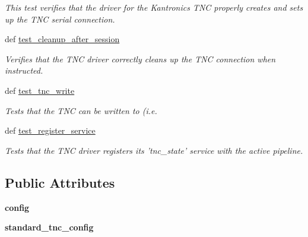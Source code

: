 \begin{DoxyCompactItemize}
\begin{DoxyCompactList}\small\item\em This test verifies that the driver for the Kantronics T\-N\-C properly creates and sets up the T\-N\-C serial connection. \end{DoxyCompactList}\item 
def \hyperlink{classhwm_1_1hardware_1_1devices_1_1drivers_1_1kantronics__tnc_1_1tests_1_1test__kantronics__tnc_1_1_test_kantronics_t_n_c_ac1971ff48d4838b899db511b9185f3a7}{test\-\_\-cleanup\-\_\-after\-\_\-session}
\begin{DoxyCompactList}\small\item\em Verifies that the T\-N\-C driver correctly cleans up the T\-N\-C connection when instructed. \end{DoxyCompactList}\item 
def \hyperlink{classhwm_1_1hardware_1_1devices_1_1drivers_1_1kantronics__tnc_1_1tests_1_1test__kantronics__tnc_1_1_test_kantronics_t_n_c_aff547efa7f6b0b6c7746dfc44da8e93e}{test\-\_\-tnc\-\_\-write}
\begin{DoxyCompactList}\small\item\em Tests that the T\-N\-C can be written to (i.\-e. \end{DoxyCompactList}\item 
def \hyperlink{classhwm_1_1hardware_1_1devices_1_1drivers_1_1kantronics__tnc_1_1tests_1_1test__kantronics__tnc_1_1_test_kantronics_t_n_c_a989a85b7954780f2c516f0b4fcaede33}{test\-\_\-register\-\_\-service}
\begin{DoxyCompactList}\small\item\em Tests that the T\-N\-C driver registers its 'tnc\-\_\-state' service with the active pipeline. \end{DoxyCompactList}\end{DoxyCompactItemize}
\subsection*{Public Attributes}
\begin{DoxyCompactItemize}
\item 
\hypertarget{classhwm_1_1hardware_1_1devices_1_1drivers_1_1kantronics__tnc_1_1tests_1_1test__kantronics__tnc_1_1_test_kantronics_t_n_c_a7ef03a21768078be4d2d52ab841e6cb2}{{\bfseries config}}\label{classhwm_1_1hardware_1_1devices_1_1drivers_1_1kantronics__tnc_1_1tests_1_1test__kantronics__tnc_1_1_test_kantronics_t_n_c_a7ef03a21768078be4d2d52ab841e6cb2}

\item 
\hypertarget{classhwm_1_1hardware_1_1devices_1_1drivers_1_1kantronics__tnc_1_1tests_1_1test__kantronics__tnc_1_1_test_kantronics_t_n_c_af45e1fee1560fc7ac0986f529adfedaa}{{\bfseries standard\-\_\-tnc\-\_\-config}}\label{classhwm_1_1hardware_1_1devices_1_1drivers_1_1kantronics__tnc_1_1tests_1_1test__kantronics__tnc_1_1_test_kantronics_t_n_c_af45e1fee1560fc7ac0986f529adfedaa}

\end{DoxyCompactItemize}

